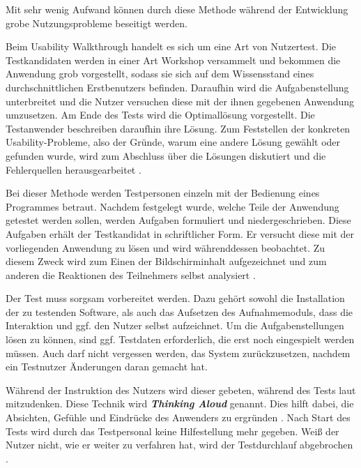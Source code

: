 Mit sehr wenig Aufwand können durch diese Methode während der Entwicklung grobe Nutzungsprobleme beseitigt werden.\par
{}
Beim Usability Walkthrough handelt es sich um eine Art von Nutzertest. Die Testkandidaten werden in einer Art Workshop versammelt und bekommen die Anwendung grob vorgestellt, sodass sie sich auf dem Wissensstand eines durchschnittlichen Erstbenutzers befinden. Daraufhin wird die Aufgabenstellung unterbreitet und die Nutzer versuchen diese mit der ihnen gegebenen Anwendung umzusetzen. Am Ende des Tests wird die Optimallösung vorgestellt. Die Testanwender beschreiben daraufhin ihre Lösung. Zum Feststellen der konkreten Usability-Probleme, also der Gründe, warum eine andere Lösung gewählt oder gefunden wurde, wird zum Abschluss über die Lösungen diskutiert und die Fehlerquellen herausgearbeitet \cite[S. 228]{Ullenboom2014}.\par
{}
Bei dieser Methode werden Testpersonen einzeln mit der Bedienung eines Programmes betraut. Nachdem festgelegt wurde, welche Teile der Anwendung getestet werden sollen, werden Aufgaben formuliert und niedergeschrieben. Diese Aufgaben erhält der Testkandidat in schriftlicher Form. Er versucht diese mit der vorliegenden Anwendung zu lösen und wird währenddessen beobachtet. Zu diesem Zweck wird zum Einen der Bildschirminhalt aufgezeichnet und zum anderen die Reaktionen des Teilnehmers selbst analysiert \cite[S. 230]{Ullenboom2014}.\par
Der Test muss sorgsam vorbereitet werden. Dazu gehört sowohl die Installation der zu testenden Software, als auch das Aufsetzen des Aufnahmemoduls, dass die Interaktion und ggf. den Nutzer selbst aufzeichnet. Um die Aufgabenstellungen lösen zu können, sind ggf. Testdaten erforderlich, die erst noch eingespielt werden müssen. Auch darf nicht vergessen werden, das System zurückzusetzen, nachdem ein Testnutzer Änderungen daran gemacht hat. \cite[S. 231]{Ullenboom2014}\par
Während der Instruktion des Nutzers wird dieser gebeten, während des Tests laut mitzudenken. Diese Technik wird \textbf{\textit{Thinking Aloud}} genannt. Dies hilft dabei, die Absichten, Gefühle und Eindrücke des Anwenders zu ergründen \cite[S. 1]{Frommann2005}. Nach Start des Tests wird durch das Testpersonal keine Hilfestellung mehr gegeben. Weiß der Nutzer nicht, wie er weiter zu verfahren hat, wird der Testdurchlauf abgebrochen \cite[S. 231]{Ullenboom2014}.

